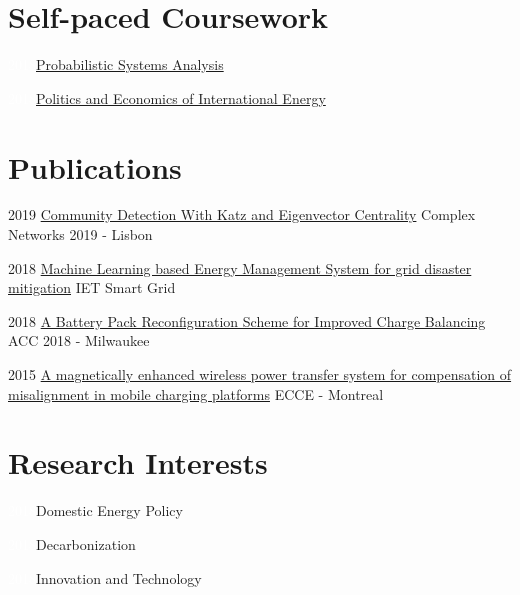 \documentclass{tccv}
\begin{document}
\section{Self-paced Coursework}
\begin{factlist}
\item{\textcolor{white}{2018}}{\href{https://github.com/markditsworth/psa}{Probabilistic Systems Analysis}}
\item{\textcolor{white}{2018}}{\href{https://github.com/markditsworth/mds}{Politics and Economics of International Energy}}
\end{factlist}

\vspace{-15pt}
\section{Publications}
\begin{yearlist}
	\item{2019}
	{\href{https://github.com/markditsworth/CompleNet2019/blob/master/Presentation.pdf}{Community Detection With Katz and Eigenvector Centrality}}
	{Complex Networks 2019 - Lisbon}
	
	\item{2018}
	{\href{https://digital-library.theiet.org/content/journals/10.1049/iet-stg.2018.0043}{Machine Learning based Energy Management System for grid disaster mitigation}}
	{IET Smart Grid}
	
	\item{2018}
	{\href{https://ieeexplore.ieee.org/document/8431612}{A Battery Pack Reconfiguration Scheme for Improved Charge Balancing}}
	{ACC 2018 - Milwaukee}
	
	\item{2015}
	{\href{http://ieeexplore.ieee.org/document/7309840/}{A magnetically enhanced wireless power transfer system for compensation of misalignment in mobile charging platforms}}
	{ECCE - Montreal}
	
\end{yearlist}

\section{Research Interests}
\begin{factlist}
	\item{\textcolor{white}{2018}}{Domestic Energy Policy}
	\item{\textcolor{white}{2018}}{Decarbonization}
	\item{\textcolor{white}{2018}}{Innovation and Technology}
\end{factlist}
\end{document}
